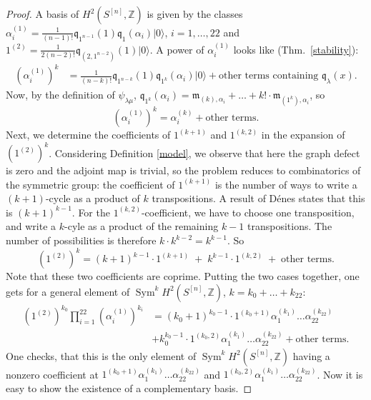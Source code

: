 \documentclass{amsart}
\DeclareMathOperator{\Sym}{Sym}
\newcommand{\hilb}[1]{^{[#1]}}
\newcommand{\vac}{|0\rangle}
\newcommand{\IZ}{\mathbb{Z}}
\newcommand{\km}{\mathfrak{m}}
\newcommand{\kq}{\mathfrak{q}}
\theoremstyle{plain}
\theoremstyle{definition}
\theoremstyle{remark}
\begin{document}
\begin{proof}
A basis of $ H^{2}(S\hilb{n},\IZ)$ is given by the classes $\alpha_i^{(1)}=\frac{1}{(n-1)!}\kq_{1^{n-1}}(1)\kq_1(\alpha_i)\vac$, $i=1,\ldots ,22$ and $1^{(2)} =\frac{1}{2(n-2)!}\kq_{(2,1^{n-2})}(1)\vac$.
A power of $\alpha_i^{(1)}$ looks like (Thm.~\ref{stability}):
\begin{align*}
\left(\alpha_i^{(1)}\right)^k & =\frac{1}{(n-k)!}\kq_{1^{n-k}}(1)\kq_{1^k}(\alpha_i)\vac + \text{other terms containing } \kq_\lambda(x).
\end{align*}
Now, by the definition of $\psi_{\lambda\mu}$, $\kq_{1^k}(\alpha_i) = \km_{(k),\alpha_i} + \ldots + k! \cdot\km_{(1^k),\alpha_i}$, so
\begin{equation}
\left(\alpha_i^{(1)}\right)^k  = \alpha_i^{(k)} + \text{other terms}.
\end{equation}
Next, we determine the coefficients of $1^{(k+1)}$ and $1^{(k,2)}$ in the expansion of $\left(1^{(2)}\right)^k$. Considering Definition \ref{model}, we observe that here the graph defect is zero and the adjoint map is trivial, so the problem reduces to combinatorics of the symmetric group: the coefficient of $1^{(k+1)}$ is the number of ways to write a $(k+1)$-cycle as a product of $k$ transpositions. A result of D\'enes \cite{Denes} states that this is $(k\!+\!1)^{k-1}$. For the $1^{(k,2)}$-coefficient, we have to choose one transposition, and write a $k$-cyle as a product of the remaining $k-1$ transpositions. The number of possibilities is therefore $k\cdot k^{k-2} = k^{k-1}$. So
\begin{equation}
\left(1^{(2)}\right)^k = (k\!+\! 1)^{k-1} \cdot 1^{(k+1)} \;+\; k^{k-1}\cdot 1^{(k,2)} \;+\; \text{other terms}.
\end{equation}
Note that these two coefficients are coprime. 
Putting the two cases together, one gets for a general element of $\Sym^kH^2(S\hilb{n},\IZ)$, $k=k_0+\ldots+k_{22}$:
\begin{align*}
\left(1^{(2)}\right)^{k_0}\prod_{i=1}^{22}\left(\alpha_i^{(1)}\right)^{k_i} &=  (k_0\!+\! 1)^{k_0-1} \cdot 1^{(k_0+1)}\alpha_1^{(k_1)}\ldots \alpha_{22}^{(k_{22})} \\
&+k_0^{k_0-1}\cdot 1^{(k_0,2)}\alpha_1^{(k_1)}\ldots \alpha_{22}^{(k_{22})} +\text{other terms}.
\end{align*}
One checks, that this is the only element of $\Sym^kH^2(S\hilb{n},\IZ)$ having a nonzero coefficient at $1^{(k_0+1)}\alpha_1^{(k_1)}\ldots \alpha_{22}^{(k_{22})}$ and $1^{(k_0,2)}\alpha_1^{(k_1)}\ldots \alpha_{22}^{(k_{22})}$. Now it is easy to show the existence of a complementary basis.
\end{proof}
\end{document}

